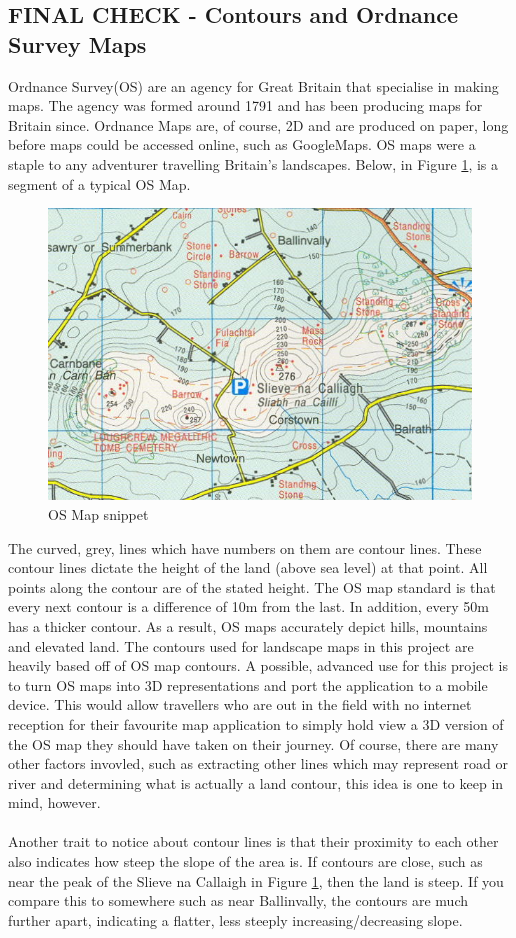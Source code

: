 \documentclass[11pt]{article}
\begin{document}
\subsection{FINAL CHECK - Contours and Ordnance Survey Maps}
Ordnance Survey(OS) are an agency for Great Britain that specialise in
making maps. The agency was formed around 1791 and has
been producing maps for Britain since. Ordnance Maps are, of course, 2D and
are produced on paper, long before maps could be accessed online, such
as GoogleMaps. OS maps were a staple to any adventurer travelling Britain's
landscapes. Below, in Figure \ref{OSmap}, is a segment of a typical OS Map.

\begin{figure}[!h]
	\centering
	\includegraphics[scale=0.7]{pics/OSmap.png}
	\caption{OS Map snippet}
	\label{OSmap}
\end{figure}

The curved, grey, lines which have numbers on them are contour lines. These contour
lines dictate the height of the land (above sea level) at that point. All points
along the contour are of the stated height. The OS map standard is 
that every next contour is a difference of 10m from the last. 
In addition, every 50m has a thicker contour. As a result, OS maps 
accurately depict hills, mountains
and elevated land. The contours used for landscape maps in this project are 
heavily based off of OS map contours. A possible, advanced use for this project
is to turn OS maps into 3D representations and port the application to
a mobile device. This would allow travellers who are
out in the field with no internet reception for their favourite map application to
simply hold view a 3D version of the OS map they should have taken on their journey.
Of course, there are many other factors invovled, such as extracting other lines
which may represent road or river and determining what is actually a land contour, 
this idea is one to keep in mind, however.\\
\\
Another trait to notice about contour lines is that their proximity to each other
also indicates how steep the slope of the area is. If contours are close, such as
near the peak of the Slieve	na Callaigh in Figure \ref{OSmap}, then the land is 
steep. If you compare this to somewhere such as near Ballinvally, the contours 
are much further apart, indicating a flatter, less steeply increasing/decreasing 
slope. 
\end{document}
